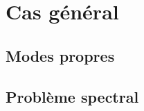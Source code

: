 \section{Cas général}

\subsection{Modes propres}

\subsection{Problème spectral}

\iffalse

Pour mémoire, voici les résultats de différents modes obtenus avec freefem++.\\

\begin{figure}[H]
\makebox[\textwidth][c]{
\texttt{[image: Exemple\_de\_modes]}}
\end{figure}

On peut voir les mêmes modes obtenus avec Feel++ dans la figure \ref{modes}.\\

\begin{figure}[H]
	\makebox[\textwidth][c]{
		\subfloat[mode00]{\texttt{[image: mode00]}}\ 
		\subfloat[mode19]{\texttt{[image: mode19]}}
	}\\
	\makebox[\textwidth][c]{
		\subfloat[mode57]{\texttt{[image: mode57]}}\ 
		\subfloat[mode194]{\texttt{[image: mode194]}}
	}
	\caption{composante z des fonctions propres}
	\label{modes}
\end{figure}

\fi



